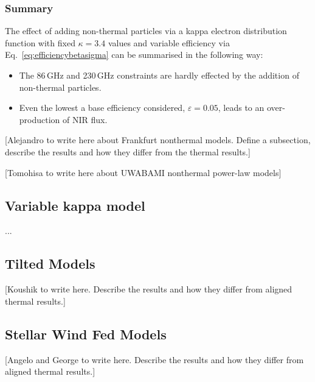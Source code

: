\subsubsection{Summary}
The effect of adding non-thermal particles via a kappa electron distribution function with fixed $\kappa=3.4$ values and variable efficiency via Eq.~\ref{eq:efficiencybetasigma} can be summarised in the following way:
\begin{itemize}
    \item The 86\,GHz and 230\,GHz constraints are hardly effected by the addition of non-thermal particles.
    \item Even the lowest a base efficiency considered, $\varepsilon=0.05$, leads to an over-production of NIR flux. 
\end{itemize}




[Alejandro to write here about Frankfurt nonthermal models.  Define a subsection, describe the results and how they differ from the thermal results.]

[Tomohisa to write here about UWABAMI nonthermal power-law models]



\subsection{Variable kappa model}
...


\subsection{Tilted Models}

[Koushik to write here.  Describe the results and how they differ from aligned thermal results.]


\subsection{Stellar Wind Fed Models}

[Angelo and George to write here.  Describe the results and how they differ from aligned thermal results.]

